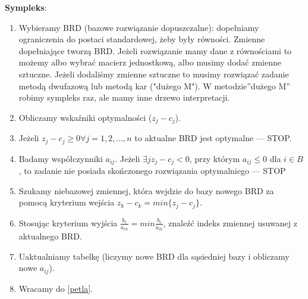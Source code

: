 \documentclass[12pt]{article}
\begin{document}
\textbf{Sympleks}:
\begin{enumerate}
	\item Wybieramy BRD (bazowe rozwiązanie dopuszczalne): dopełniamy ograniczenia do postaci standardowej, żeby były równości. Zmienne dopełniające tworzą BRD. Jeżeli rozwiązanie mamy dane z równościami to możemy albo wybrać macierz jednostkową, albo musimy dodać zmienne sztuczne. Jeżeli dodaliśmy zmienne sztuczne to musimy rozwiązać zadanie metodą dwufazową lub metodą kar ("dużego M"). W metodzie''dużego M'' robimy sympleks raz, ale mamy inne drzewo interpretacji.
	\item \label{petla} Obliczamy wskaźniki optymalności ($z_{j} - c_{j}$).
	\item Jeżeli $z_{j} - c_{j} \geq 0 \forall j = 1,2,...,n$ to aktualne BRD jest optymalne --- STOP.
	\item Badamy współczynniki $a_{ij}$. Jeżeli $ \exists j z_{j} - c_{j} < 0$, przy którym $a_{ij} \leq 0$ dla $i \in B$, to zadanie nie posiada skończonego rozwiązania optymalniego --- STOP
	\item Szukamy niebazowej zmiennej, która wejdzie do bazy nowego BRD za pomocą kryterium wejścia  $z_{k} - c_{k} = min\{ z_{j} - c_{j}\}$.
	\item Stosując kryterium wyjścia $\frac{b_{r}}{a_{rk}} = min{\frac{b_{i}}{a_{ik}}}$, znaleźć indeks zmiennej usuwanej z aktualnego BRD.
	\item Uaktualniamy tabelkę (liczymy nowe BRD dla sąsiedniej bazy i obliczamy nowe $a_{ij}$).
	\item Wracamy do \ref{petla}.
\end{enumerate}
\end{document}
